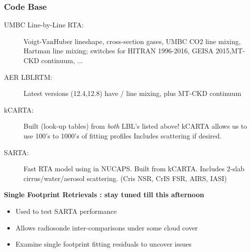 \documentclass[10pt,t]{beamer}
\begin{document}
\begin{frame}
  \frametitle{Code Base}
  \vspace{-0.1 in}
  \begin{description}
  \item [UMBC Line-by-Line RTA:] Voigt-VanHuber lineshape, cross-section
    gases, UMBC CO2 line mixing, Hartman line mixing; switches for HITRAN 1996-2016, GEISA 2015,MT-CKD continuum, ...
  \item [AER LBLRTM:] Latest versions (12.4,12.8) have \cd/\methane
    line mixing, plus MT-CKD continuum
  \item[kCARTA:] Built (look-up tables) from \emph{both} LBL's listed
    above!  kCARTA allows us to use 100's to 1000's of fitting profiles
    Includes scattering if desired.
  \item[SARTA:] Fast RTA model using in NUCAPS.  Built from kCARTA.
    Includes 2-slab cirrus/water/aerosol scattering. (Cris NSR, CrIS FSR,
    AIRS, IASI)
  \end{description}

  \vspace{-0.0625in} \textbf{Single Footprint Retrievals : stay tuned till this afternoon}
  \vspace{-0.0625in}
  \begin{itemize}
  \item Used to test SARTA performance
  \item Allows radiosonde inter-comparisons under some cloud cover
  \item Examine single footprint fitting residuals to uncover issues
  \end{itemize}

\end{frame}
\end{document}
